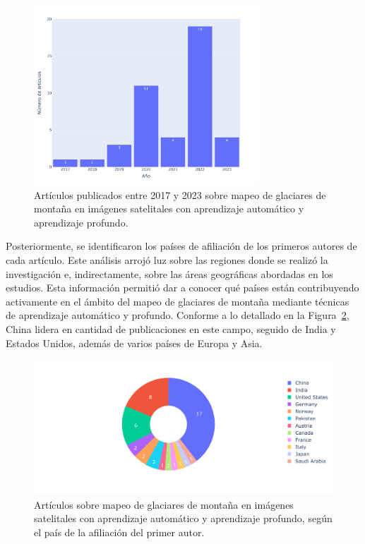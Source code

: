 \begin{figure}[H]
    \begin{center}
    \includegraphics[width=0.75\textwidth]{Images/ArticuloAnio.pdf}
    \end{center}
    \caption{Artículos publicados entre 2017 y 2023 sobre mapeo de glaciares de montaña en imágenes satelitales con aprendizaje automático y aprendizaje profundo.}
     \label{fig:ArticuloAnio}
\end{figure}

Posteriormente, se identificaron los países de afiliación de los primeros autores de cada artículo. Este análisis arrojó luz sobre las regiones donde se realizó la investigación e, indirectamente, sobre las áreas geográficas abordadas en los estudios. Esta información permitió dar a conocer qué países están contribuyendo activamente en el ámbito del mapeo de glaciares de montaña mediante técnicas de aprendizaje automático y profundo. Conforme a lo detallado en la Figura~\ref{fig:ArticuloPaises}, China lidera en cantidad de publicaciones en este campo, seguido de India y Estados Unidos, además de varios países de Europa y Asia.

\begin{figure}[H]
    \begin{center}
    \includegraphics[width=1\textwidth]{Images/ArticuloPaises.pdf}
    \end{center}
    \caption{Artículos sobre mapeo de glaciares de montaña en imágenes satelitales con aprendizaje automático y aprendizaje profundo, según el país de la afiliación del primer autor.}
     \label{fig:ArticuloPaises}
\end{figure}

